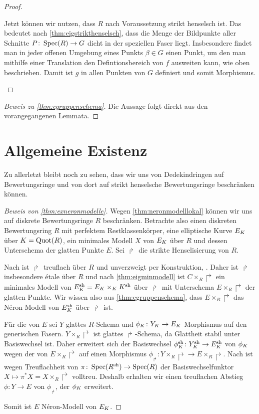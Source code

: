 \begin{Lemma}
\begin{proof}
\begin{description}
      Jetzt können wir nutzen, dass $R$ nach Voraussetzung strikt
      henselsch ist. Das bedeutet nach
      \ref{thm:eigstrikthenselsch}, dass die Menge der Bildpunkte
      aller Schnitte $P\colon\operatorname{Spec}(R)\to G$ dicht in der
      speziellen Faser liegt.
      Insbesondere findet man in jeder offenen Umgebung eines
      Punkts $\beta\in G$ einen Punkt, um den man mithilfe einer
      Translation den Defintionsbereich von $f$ ausweiten kann, wie
      oben beschrieben.
      Damit ist $g$ in allen Punkten von $G$ definiert und somit
      Morphismus.
    \end{description}
  \end{proof}
\end{Lemma}

\begin{proof}[Beweis zu \ref{thm:egruppenschema}]
  Die Aussage folgt direkt aus den vorangegangenen Lemmata.
\end{proof}


\section{Allgemeine Existenz}\label{chap:exneronmodellebeweis}
Zu allerletzt bleibt noch zu sehen, dass wir uns von Dedekindringen
auf Bewertungsringe und von dort auf strikt henselsche Bewertungsringe
beschränken können.
\begin{proof}[Beweis von \ref{thm:exneronmodelle}]
  Wegen \ref{thm:neronmodelllokal} können wir uns auf
  diskrete Bewertungsringe $R$ beschränken.
  Betrachte also einen diskreten Bewertungsring $R$ mit perfektem
  Restklassenkörper, eine elliptische Kurve $E_{K}$ über $K=\operatorname{Quot}(R)$,
  ein minimales Modell $X$ von $E_{K}$ über $R$ und dessen Unterschema
  der glatten Punkte $E$.
  Sei $\Rsh$ die strikte Henselisierung von $R$.

  Nach \cite[Chapter 2.4, Corollary 9]{neron} ist $\Rsh$ treuflach
  über $R$ und unverzweigt per Konstruktion,
  \cite[vgl.][Chapter 2.3, Proposition 11]{neron}.
  Daher ist $\Rsh$ insbesondere étale über $R$ und nach
  \ref{thm:eigminmodell} ist $C\times_R\Rsh$ ein minimales Modell von
  $E_\Ksh=E_\K\times_\K\Ksh$ über $\Rsh$ mit Unterschema
  $E\times_R\Rsh$ der glatten Punkte.
  Wir wissen also aus \ref{thm:egruppenschema}, dass $E\times_R\Rsh$
  das Néron-Modell von $E_\Ksh$ über $\Rsh$ ist.

  Für die \NAbbEig von $E$ sei $Y$ glattes $R$-Schema und
  $\phi_{K}\colon Y_{K}\to E_{K}$ Morphismus auf den generischen Fasern.
  $Y\times_R\Rsh$ ist glattes $\Rsh$-Schema, da Glattheit stabil unter
  Basiswechsel ist. Daher erweitert sich der Basiswechsel
  $\phi_\Ksh\colon Y_\Ksh\to E_\Ksh$ von $\phi_{K}$ wegen der \NAbbEig
  von $E\times_R\Rsh$ auf einen Morphismus $\phi_\Rsh\colon
  Y\times_R\Rsh\to E\times_R\Rsh$.
  Nach \cite[Chapter 6.1, Theorem 6]{neron} ist wegen Treuflachheit
  von $\pi\colon\operatorname{Spec}(R^{\text{sh}})\to\operatorname{Spec}(R)$ der Basiswechselfunktor
  $X\mapsto \pi^*X=X\times_R\Rsh$ volltreu. Deshalb erhalten wir einen
  treuflachen Abstieg $\phi\colon Y\to E$ von $\phi_\Rsh$, der
  $\phi_{K}$ erweitert.

  Somit ist $E$ Néron-Modell von $E_{K}$.
\end{proof}

